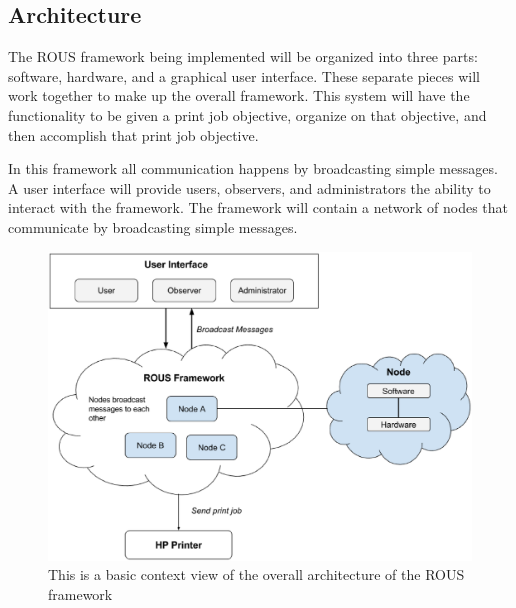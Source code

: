 \documentclass[draftclsnofoot, onecolumn, compsoc, 10pt]{IEEEtran}
\begin{document}
\subsection{Architecture}
The ROUS framework being implemented will be organized into three parts: software, hardware, and a graphical user interface. These separate pieces will work together to make up the overall framework. This system will have the functionality to be given a print job objective, organize on that objective, and then accomplish that print job objective.

In this framework all communication happens by broadcasting simple messages. A user interface will provide users, observers, and administrators the ability to interact with the framework. The framework will contain a network of nodes that communicate by broadcasting simple messages. 
\begin{figure}[H]
\centering
	\includegraphics[scale=.55]{context}
	\captionsetup{justification=centering}
    \caption{This is a basic context view of the overall architecture of the ROUS framework}
\end{figure}

\end{document}
